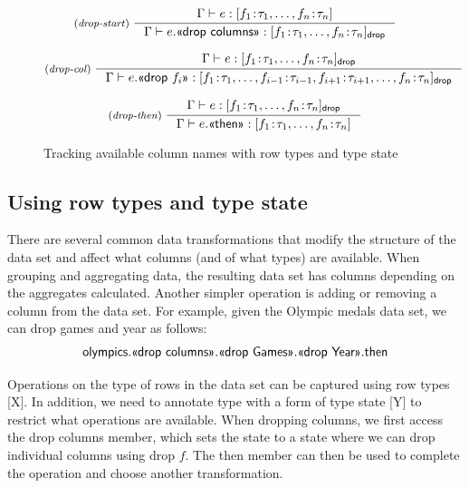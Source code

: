 \documentclass[a4paper,UKenglish]{lipics-v2016}
\theoremstyle{plain}
\theoremstyle{definition}
\newcommand{\ident}[1]{\textnormal{\sffamily #1}}
\newcommand{\qident}[1]{\textnormal{\sffamily \guillemotleft #1\guillemotright}}
\begin{document}
\begin{figure}

\begin{equation*}
\inference[(\emph{drop-start})~]
  {\Gamma \vdash e : [f_1\!:\!\tau_1, \ldots, f_n\!:\!\tau_n]}
  {\Gamma \vdash e.\qident{drop columns}: [f_1\!:\!\tau_1, \ldots, f_n\!:\!\tau_n]_{\ident{drop}}}
\end{equation*}

\begin{equation*}
\inference[(\emph{drop-col})~]
  {\Gamma \vdash e : [f_1\!:\!\tau_1, \ldots, f_n\!:\!\tau_n]_{\ident{drop}}}
  {\Gamma \vdash e.\qident{drop~$f_i$}: [f_1\!:\!\tau_1, \ldots, f_{i-1}\!:\!\tau_{i-1}, f_{i+1}\!:\!\tau_{i+1}, \ldots, f_n\!:\!\tau_n ]_{\ident{drop}}}
\end{equation*}

\begin{equation*}
\inference[(\emph{drop-then})~]
  {\Gamma \vdash e : [f_1\!:\!\tau_1, \ldots, f_n\!:\!\tau_n]_{\ident{drop}}}
  {\Gamma \vdash e.\qident{then}: [f_1\!:\!\tau_1, \ldots, f_n\!:\!\tau_n]}
\end{equation*}


\caption{Tracking available column names with row types and type state}
\label{fig:fancy-types}
\end{figure}


\subsection{Using row types and type state}
\label{sec:columns-row}

There are several common data transformations that modify the structure of the data set and affect
what columns (and of what types) are available. When grouping and aggregating data, the resulting
data set has columns depending on the aggregates calculated. Another simpler operation is adding
or removing a column from the data set. For example, given the Olympic medals data set, we can 
drop games and year as follows:
%
\begin{equation*}
  \begin{array}{l}
    \ident{olympics}.\qident{drop columns}.\qident{drop Games}.\qident{drop Year}.\ident{then}
  \end{array}
\end{equation*}

\noindent
Operations on the type of rows in the data set can be captured using row types [X]. In addition, 
we need to annotate type with a form of type state [Y] to restrict what operations are available. 
When dropping columns, we first access the \qident{drop columns} member, which sets the state to
a state where we can drop individual columns using \qident{drop $f$}. The \ident{then} member can 
then be used to complete the operation and choose another transformation.
\end{document}
